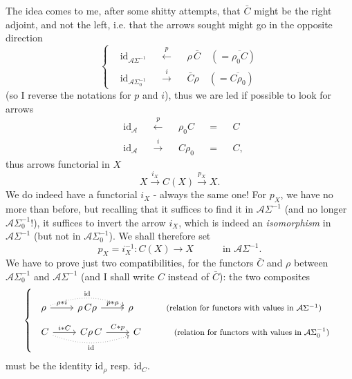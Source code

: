 \documentclass[11pt]{article}
\newcommand{\printedpage}[1]{\marginpar{\footnotesize p.~#1}}
\newcommand{\msp}[1]{\marginpar{\footnotesize [#1]}}
\newcommand{\id}{\mathrm{id}}
\newcommand{\cA}{\mathcal{A}}
\begin{document}
\printedpage{41}

\msp{page 67}
The idea comes to me, after some shitty attempts, that $\bar{C}$ might be the right adjoint, and not the left, i.e. that the arrows sought might go in the opposite direction
\[
\left\{
\begin{aligned}
&\id_{\cA\Sigma^{-1}}&&\xleftarrow{\ p\ }&&\rho\,\bar{C}\quad(=\overline{\rho_0C})\\
&\id_{\cA\Sigma_0^{-1}}&&\xrightarrow{\ i\ }&&\bar{C}\rho\quad(=\overline{C\rho_0})
\end{aligned}
\right.
\]
(so I reverse the notations for $p$ and $i$), thus we are led if possible to look for arrows
\[
\begin{aligned}
&\id_{\cA}&&\xleftarrow{\ p\ }&&\rho_0C&&=&&C\\
&\id_{\cA}&&\xrightarrow{\ i\ }&&C\rho_0&&=&&C,
\end{aligned}
\]
thus arrows functorial in $X$
\[
X\xrightarrow{i_X}C(X)\xrightarrow{p_X}X.
\]
We do indeed have a functorial $i_X$ - always the same one! For $p_X$, we have no more than before, but recalling that it suffices to find it in $\cA\Sigma^{-1}$ (and no longer $\cA\Sigma_0^{-1}$!), it suffices to invert the arrow $i_X$, which is indeed an \textit{isomorphism} in $\cA\Sigma^{-1}$ (but not in $\cA\Sigma_0^{-1}$). We shall therefore set
\[
p_X=i_X^{-1}:C(X)\longrightarrow X\qquad\quad\text{in }\cA\Sigma^{-1}.
\]
We have to prove just two compatibilities, for the functors $\bar{C}$ and $\rho$ between $\cA\Sigma_0^{-1}$ and $\cA\Sigma^{-1}$ (and I shall write $C$ instead of $\bar{C}$): the two composites
\[
\left\{
\begin{array}{l}
\begin{tikzcd}[ampersand replacement=\&]
\rho \arrow[r, "\rho*i"] \arrow[rr, bend left=20, dotted, "\id"] \& \rho\,C\rho \arrow[r, "p*\rho"] \& \rho
\end{tikzcd}
\qquad\quad\text{\footnotesize (relation for functors with values in $\cA\Sigma^{-1}$)}\\[2ex]
\begin{tikzcd}[ampersand replacement=\&]
C \arrow[r, "i*C"] \arrow[rr, bend right=20, dotted, "\id"'] \& C\rho\,C \arrow[r, "C*p"] \& C
\end{tikzcd}
\qquad\quad\text{\footnotesize (relation for functors with values in $\cA\Sigma_0^{-1}$)}
\end{array}
\right.
\]
must be the identity $\id_\rho$ resp. $\id_C$.
\end{document}
